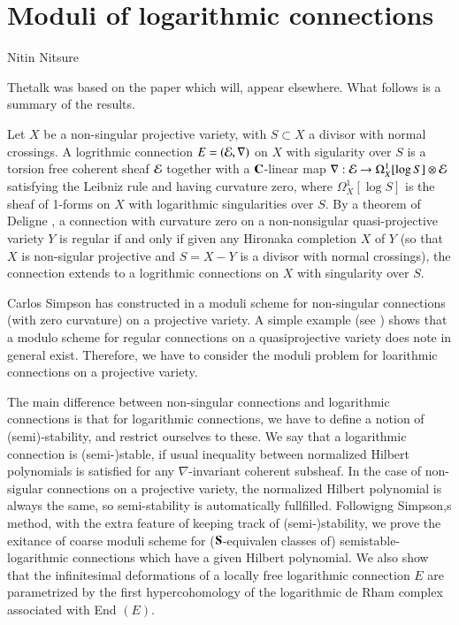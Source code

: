 \chapter{Moduli of logarithmic connections}\label{chap14}

\begin{center}
Nitin Nitsure
\end{center}


\setcounter{pageoriginal}{272}
The\pageoriginale talk was based on the paper \cite{chap14-keyN} which will, appear elsewhere. What follows is a summary of the results.

Let $X$ be a non-singular projective variety, with $S\subset X$ a divisor with normal crossings. A logrithmic connection $E=(\mathcal{E}, \nabla)$ on $X$ with sigularity over $S$ is a torsion free coherent sheaf  $\mathcal{E}$ together with a $\mathbf{C}$-linear map $\nabla : \mathcal{E} \rightarrow \Omega_{X}^{1}[\log S] \otimes \mathcal{E}$ satisfying the Leibniz rule and having curvature zero, where $\Omega_{X}^{1}[\log S]$ is the sheaf of 1-forms on $X$ with logarithmic singularities over $S$. By a theorem of Deligne \cite{chap14-keyD}, a connection with curvature zero on a non-nonsigular quasi-projective variety $Y$ is regular if and only if given any Hironaka completion $X$ of $Y$ (so that $X$ is non-sigular projective and $S=X-Y$ is a divisor with normal crossings), the connection extends to a logrithmic connections on $X$ with singularity over $S$.

Carlos Simpson has constructed in \cite{chap14-keyS} a moduli scheme for non-singular connections (with zero curvature) on a projective variety. A simple example (see \cite{chap14-keyN}) shows that a modulo scheme for regular connections on a quasiprojective variety does note in general exist. Therefore, we have to consider the moduli problem for loarithmic connections on a projective variety.

The main difference between non-singular connections and logarithmic  connections is that for logarithmic connections,  we have to define a notion of (semi)-stability, and restrict ourselves to these. We say that  a logarithmic connection is (semi-)stable, if usual inequality between normalized Hilbert polynomials is satisfied for any $\nabla$-invariant coherent subsheaf. In the case of non-sigular connections on a projective variety, the normalized Hilbert polynomial is always the same, so semi-stability is automatically fullfilled. Followigng Simpson,s method, with the extra feature of keeping track of (semi-)stability, we prove the exitance of coarse moduli scheme for ($\mathbf{S}$-equivalen classes of) semistable-logarithmic connections which have a given Hilbert polynomial. We also show that the infinitesimal deformations of a locally free logarithmic connection $E$ are parametrized by the first hypercohomology of the logarithmic de Rham complex associated with End $(E)$.

